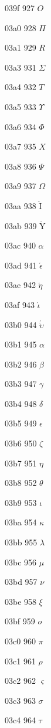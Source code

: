 \documentclass[11pt]{article}
\begin{document}
039f 927 \ensuremath{O}

03a0 928 \ensuremath{\Pi}

03a1 929 \ensuremath{{R}}

03a3 931 \ensuremath{\Sigma}

03a4 932 \ensuremath{{T}}

03a5 933 \ensuremath{\Upsilon}

03a6 934 \ensuremath{\Phi}

03a7 935 \ensuremath{{X}}

03a8 936 \ensuremath{\Psi}

03a9 937 \ensuremath{\Omega}

03aa 938 \ensuremath{\mathrm{\ddot{I}}}

03ab 939 \ensuremath{\mathrm{\ddot{Y}}}

03ac 940 \'{$\alpha$}

03ad 941 \ensuremath{\acute{\epsilon}}

03ae 942 \ensuremath{\acute{\eta}}

03af 943 \ensuremath{\acute{\iota}}

03b0 944 \ensuremath{\acute{\ddot{\upsilon}}}

03b1 945 \ensuremath{\alpha}

03b2 946 \ensuremath{\beta}

03b3 947 \ensuremath{\gamma}

03b4 948 \ensuremath{\delta}

03b5 949 \ensuremath{\epsilon}

03b6 950 \ensuremath{\zeta}

03b7 951 \ensuremath{\eta}

03b8 952 \ensuremath{\theta}

03b9 953 \ensuremath{\iota}

03ba 954 \ensuremath{\kappa}

03bb 955 \ensuremath{\lambda}

03bc 956 \ensuremath{\mu}

03bd 957 \ensuremath{\nu}

03be 958 \ensuremath{\xi}

03bf 959 \ensuremath{o}

03c0 960 \ensuremath{\pi}

03c1 961 \ensuremath{\rho}

03c2 962 \ensuremath{\varsigma}

03c3 963 \ensuremath{\sigma}

03c4 964 \ensuremath{\tau}
\end{document}
